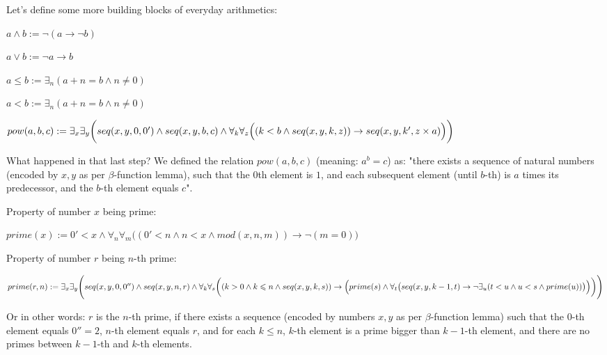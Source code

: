 \documentclass{article}
\begin{document}
Let's define some more building blocks of everyday arithmetics:

\begin{center}
    $a \land b := \neg(a \rightarrow \neg b)$

    $a \lor b := \neg a \rightarrow b$
    
    $a \leqslant b := \exists_n (a + n = b \land n \neq 0)$
    
    $a < b := \exists_n (a + n = b \land n \neq 0)$

    $ pow(a, b, c) := \exists_x \exists_y \biggl(
        seq(x, y, 0, 0') \land seq(x, y, b, c) \land
        \forall_k \forall_z \Bigl(
            (k < b \land seq(x, y, k, z))
            \rightarrow
            seq(x, y, k', z \times a)
        \Bigl)
    \biggl) $
\end{center}

What happened in that last step? We defined the relation $pow(a, b, c)$ (meaning: $a^b = c$)
as: "there exists a sequence of natural numbers (encoded by $x, y$ as per $\beta$-function
lemma), such that the $0$th element is $1$, and each subsequent element (until $b$-th) is
$a$ times its predecessor, and the $b$-th element equals $c$".

Property of number $x$ being prime:

\begin{center}
    $prime(x) := 0' < x \land \forall_n \forall_m \bigl(
        (0' < n \land n < x \land mod(x, n, m)) \rightarrow \neg (m = 0)
    \bigl)$
\end{center}

Property of number $r$ being $n$-th prime:

\begin{center}
    $prime(r, n) := \exists_x \exists_y \Biggl(
        seq(x, y, 0, 0'') \land seq(x, y, n, r) \land
        \forall_k \forall_s \biggl(
            (k > 0 \land k \leqslant n \land seq(x, y, k, s))
            \rightarrow
            \Bigl(
                prime(s) \land \forall_t \bigl(
                    seq(x, y, k-1, t)
                    \rightarrow
                    \neg \exists_u (t < u \land u < s \land prime(u))
                \bigl)
            \Bigl)
        \biggl)
    \Biggl)$
\end{center}

Or in other words: $r$ is the $n$-th prime, if there exists a sequence (encoded by numbers
$x, y$ as per $\beta$-function lemma) such that the $0$-th element equals $0'' = 2$, $n$-th element
equals $r$, and for each $k \leqslant n$, $k$-th element is a prime bigger than $k-1$-th element,
and there are no primes between $k-1$-th and $k$-th elements.
\end{document}
